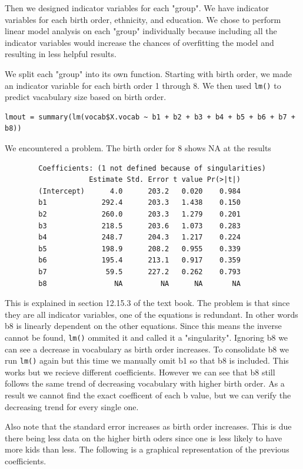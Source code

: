 \documentclass[fleqn]{article}
\begin{document}
	Then we designed indicator variables for each "group". We have indicator variables for each birth order, ethnicity, and education. We chose to perform linear model analysis on each "group" individually because including all the indicator variables would increase the chances of overfitting the model and resulting in less helpful results. 

	We split each "group" into its own function. Starting with birth order, we made an indicator variable for each birth order 1 through 8. We then used \texttt{lm()} to predict vacabulary size based on birth order.

	\begin{verbatim}lmout = summary(lm(vocab$X.vocab ~ b1 + b2 + b3 + b4 + b5 + b6 + b7 + b8))\end{verbatim}

	We encountered a problem. The birth order for 8 shows NA at the results

	\begin{verbatim}
		Coefficients: (1 not defined because of singularities)
		            Estimate Std. Error t value Pr(>|t|)
		(Intercept)      4.0      203.2   0.020    0.984
		b1             292.4      203.3   1.438    0.150
		b2             260.0      203.3   1.279    0.201
		b3             218.5      203.6   1.073    0.283
		b4             248.7      204.3   1.217    0.224
		b5             198.9      208.2   0.955    0.339
		b6             195.4      213.1   0.917    0.359
		b7              59.5      227.2   0.262    0.793
		b8                NA         NA      NA       NA
	\end{verbatim}

	This is explained in section 12.15.3 of the text book. The problem is that since they are all indicator variables, one of the equations is redundant. In other words b8 is linearly dependent on the other equations. Since this means the inverse cannot be found, \texttt{lm()} ommited it and called it a "singularity".
	Ignoring b8 we can see a decrease in vocabulary as birth order increases. To consolidate b8 we run \texttt{lm()} again but this time we manually omit b1 so that b8 is included. This works but we recieve different coefficients. However we can see that b8 still follows the same trend of decreasing vocabulary with higher birth order. As a result we cannot find the exact coefficent of each b value, but we can verify the decreasing trend for every single one.

	Also note that the standard error increases as birth order increases. This is due there being less data on the higher birth oders since one is less likely to have more kids than less.
	The following is a graphical representation of the previous coefficients.\\
\end{document}
